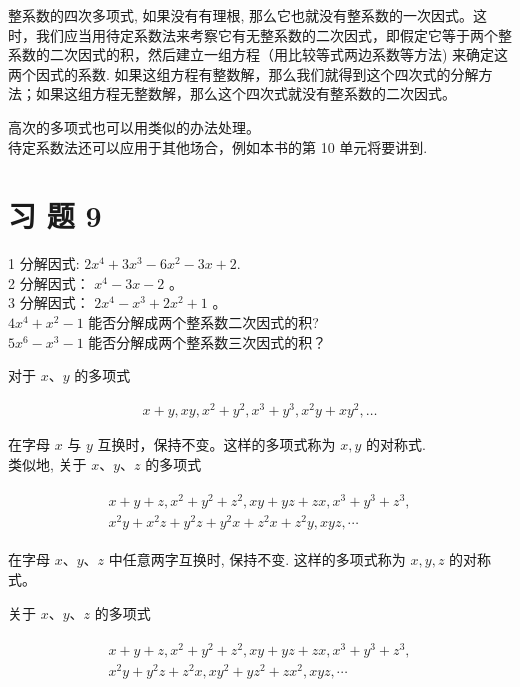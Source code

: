 \documentclass[10pt]{article}
\begin{document}
整系数的四次多项式, 如果没有有理根, 那么它也就没有整系数的一次因式。这时，我们应当用待定系数法来考察它有无整系数的二次因式，即假定它等于两个整系数的二次因式的积，然后建立一组方程（用比较等式两边系数等方法) 来确定这两个因式的系数. 如果这组方程有整数解，那么我们就得到这个四次式的分解方法；如果这组方程无整数解，那么这个四次式就没有整系数的二次因式。

高次的多项式也可以用类似的办法处理。\\
待定系数法还可以应用于其他场合，例如本书的第 10 单元将要讲到.

\section*{习 题 9}
1 分解因式: $2 x^{4}+3 x^{3}-6 x^{2}-3 x+2$.\\
2 分解因式： $x^{4}-3 x-2$ 。\\
3 分解因式： $2 x^{4}-x^{3}+2 x^{2}+1$ 。\\
$4 x^{4}+x^{2}-1$ 能否分解成两个整系数二次因式的积?\\
$5 x^{6}-x^{3}-1$ 能否分解成两个整系数三次因式的积？

对于 $x 、 y$ 的多项式

\begin{align*}
x+y, x y, x^{2}+y^{2}, x^{3}+y^{3}, x^{2} y+x y^{2}, \ldots \tag{1}
\end{align*}

在字母 $x$ 与 $y$ 互换时，保持不变。这样的多项式称为 $x, y$ 的对称式.\\
类似地, 关于 $x 、 y 、 z$ 的多项式

\begin{align*}
\begin{gather*}
x+y+z, x^{2}+y^{2}+z^{2}, x y+y z+z x, x^{3}+y^{3}+z^{3}, \\
x^{2} y+x^{2} z+y^{2} z+y^{2} x+z^{2} x+z^{2} y, x y z, \cdots
\end{gather*} \tag{2}
\end{align*}

在字母 $x 、 y 、 z$ 中任意两字互换时, 保持不变. 这样的多项式称为 $x, y, z$ 的对称式。

关于 $x 、 y 、 z$ 的多项式

\begin{align*}
\begin{gather*}
x+y+z, x^{2}+y^{2}+z^{2}, x y+y z+z x, x^{3}+y^{3}+z^{3}, \\
x^{2} y+y^{2} z+z^{2} x, x y^{2}+y z^{2}+z x^{2}, x y z, \cdots
\end{gather*} \tag{3}
\end{align*}
\end{document}
